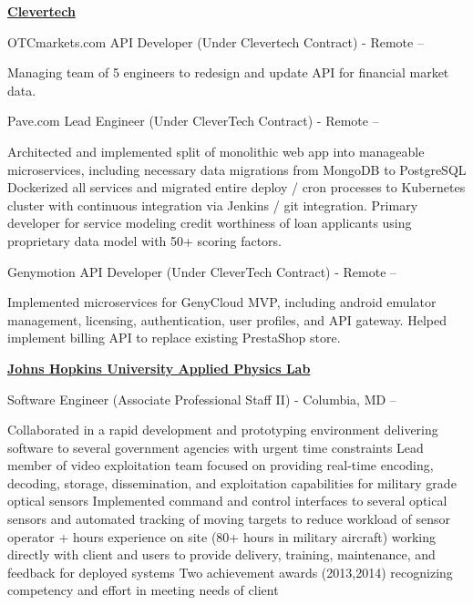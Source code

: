 \documentclass[a4paper,10pt,oneside]{article}
\begin{document}
\begin{body}
\href{http://www.clevertech.biz/}
{\textbf{Clevertech}}
\par
OTCmarkets.com API Developer (Under Clevertech Contract) - Remote
\hfill
{} -- 
\begin{detail}
\BulletItem Managing team of 5 engineers to redesign and update API for financial market data. 
\end{detail}

\par
Pave.com Lead Engineer (Under CleverTech Contract) - Remote
\hfill
{} -- 
\begin{detail}
\BulletItem Architected and implemented split of monolithic web app into manageable microservices, including necessary data migrations from MongoDB to PostgreSQL
\BulletItem Dockerized all services and migrated entire deploy / cron processes to Kubernetes cluster with continuous integration via Jenkins / git integration. 
\BulletItem Primary developer for service modeling credit worthiness of loan applicants using proprietary data model with 50+ scoring factors. 
\end{detail} 

\par
Genymotion API Developer (Under CleverTech Contract) - Remote
\hfill
{} -- 
\begin{detail}
\BulletItem Implemented microservices for GenyCloud MVP, including android emulator management, licensing, authentication, user profiles, and API gateway. 
\BulletItem Helped implement billing API to replace existing PrestaShop store. 
\end{detail}

\EntryGap

\href{http://www.jhuapl.edu/}
{\textbf{Johns Hopkins University Applied Physics Lab}}
\par
Software Engineer (Associate Professional Staff II) - Columbia, MD
\hfill
{} --
\begin{detail}

\BulletItem
Collaborated in a rapid development and prototyping environment delivering software to several government agencies with urgent time constraints
\BulletItem
Lead member of video exploitation team focused on providing real-time encoding, decoding, storage, dissemination, and exploitation capabilities for military grade optical sensors
\BulletItem
Implemented command and control interfaces to several optical sensors and automated tracking of moving targets to reduce workload of sensor operator
+ hours experience on site (80+ hours in military aircraft) working directly with client and users to provide delivery, training, maintenance, and feedback for deployed systems
\BulletItem
Two achievement awards (2013,2014) recognizing competency and effort in meeting needs of client
\end{detail}


\end{body}
\end{document}
